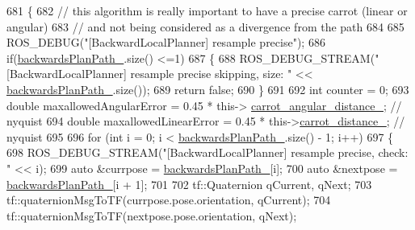 \begin{DoxyCode}
681         \{
682             \textcolor{comment}{// this algorithm is really important to have a precise carrot (linear or angular)}
683             \textcolor{comment}{// and not being considered as a divergence from the path}
684 
685             ROS\_DEBUG(\textcolor{stringliteral}{"[BackwardLocalPlanner] resample precise"});
686             \textcolor{keywordflow}{if}(\hyperlink{classcl__move__base__z_1_1backward__local__planner_1_1BackwardLocalPlanner_ad9cde5c85f782cab2ddb4030e3c3f2cf}{backwardsPlanPath\_}.size() <=1)
687             \{
688                 ROS\_DEBUG\_STREAM(\textcolor{stringliteral}{"[BackwardLocalPlanner] resample precise skipping, size: "} << 
      \hyperlink{classcl__move__base__z_1_1backward__local__planner_1_1BackwardLocalPlanner_ad9cde5c85f782cab2ddb4030e3c3f2cf}{backwardsPlanPath\_}.size());
689                 \textcolor{keywordflow}{return} \textcolor{keyword}{false};
690             \}
691 
692             \textcolor{keywordtype}{int} counter = 0;
693             \textcolor{keywordtype}{double} maxallowedAngularError = 0.45 * this->
      \hyperlink{classcl__move__base__z_1_1backward__local__planner_1_1BackwardLocalPlanner_a63e30befa09c4a67cf55086923b760c7}{carrot\_angular\_distance\_}; \textcolor{comment}{// nyquist}
694             \textcolor{keywordtype}{double} maxallowedLinearError = 0.45 * this->\hyperlink{classcl__move__base__z_1_1backward__local__planner_1_1BackwardLocalPlanner_a0bbb80ce5bae865c4322869422803296}{carrot\_distance\_};          \textcolor{comment}{//
       nyquist}
695 
696             \textcolor{keywordflow}{for} (\textcolor{keywordtype}{int} i = 0; i < \hyperlink{classcl__move__base__z_1_1backward__local__planner_1_1BackwardLocalPlanner_ad9cde5c85f782cab2ddb4030e3c3f2cf}{backwardsPlanPath\_}.size() - 1; i++)
697             \{
698                 ROS\_DEBUG\_STREAM(\textcolor{stringliteral}{"[BackwardLocalPlanner] resample precise, check: "} << i);
699                 \textcolor{keyword}{auto} &currpose = \hyperlink{classcl__move__base__z_1_1backward__local__planner_1_1BackwardLocalPlanner_ad9cde5c85f782cab2ddb4030e3c3f2cf}{backwardsPlanPath\_}[i];
700                 \textcolor{keyword}{auto} &nextpose = \hyperlink{classcl__move__base__z_1_1backward__local__planner_1_1BackwardLocalPlanner_ad9cde5c85f782cab2ddb4030e3c3f2cf}{backwardsPlanPath\_}[i + 1];
701 
702                 tf::Quaternion qCurrent, qNext;
703                 tf::quaternionMsgToTF(currpose.pose.orientation, qCurrent);
704                 tf::quaternionMsgToTF(nextpose.pose.orientation, qNext);

\end{DoxyCode}
